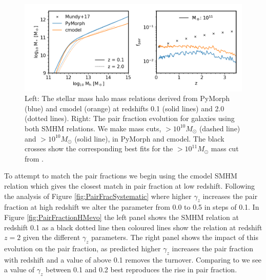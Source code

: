 \begin{figure}
	\centering
	\includegraphics[width = \linewidth]{Figures/Chapter5/PairFractionData.png}
    \caption{Left: The stellar mass halo mass relations derived from PyMorph (blue) and cmodel (orange) at redshifts 0.1 (solid lines) and 2.0 (dotted lines). Right: The pair fraction evolution for galaxies using both SMHM relations. We make mass cuts, $>10^{10}M_{\odot}$ (dashed line) and $>10^{10}M_{\odot}$ (solid line), in PyMorph and cmodel. The black crosses show the corresponding best fits for the $>10^{11}M_{\odot}$ mass cut from \citet{Mundy2017A3.5}.}
	\label{fig:PairFractionData}
\end{figure}

To attempt to match the \citet{Mundy2017A3.5} pair fractions we begin using the cmodel SMHM relation which gives the closest match in pair fraction at low redshift. Following the analysis of Figure \ref{fig:PairFracSystematic} where higher $\gamma_{z}$ increases the pair fraction at high redshift we alter the parameter from 0.0 to 0.5 in steps of 0.1. In Figure \ref{fig:PairFractionHMevo} the left panel shows the SMHM relation at redshift 0.1 as a black dotted line then coloured lines show the relation at redshift $z = 2$ given the different $\gamma_{z}$ parameters. The right panel shows the impact of this evolution on the pair fraction, as predicted higher $\gamma_{z}$ increases the pair fraction with redshift and a value of above 0.1 removes the turnover. Comparing to \citet{Mundy2017A3.5} we see a value of $\gamma_{z}$ between 0.1 and 0.2 best reproduces the rise in pair fraction. 

